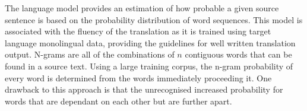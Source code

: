 
The language model provides an estimation of how probable a given source sentence is based on the probability distribution of word sequences. This model is associated with the fluency of the translation as it is trained using target language monolingual data, providing the guidelines for well written translation output. N-grams are all of the combinations of $n$ contiguous words that can be found in a source text. Using a large training corpus, the n-gram probability of every word is determined from the words immediately proceeding it. One drawback to this approach is that the unrecognised increased probability for words that are dependant on each other but are further apart.












